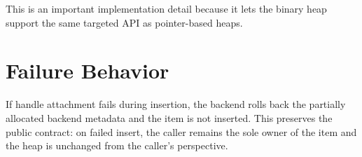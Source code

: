 This is an important implementation detail because it lets the binary heap support the same targeted API as pointer-based heaps.

\section{Failure Behavior}

If handle attachment fails during insertion, the backend rolls back the partially allocated backend metadata and the item is not inserted.
This preserves the public contract: on failed insert, the caller remains the sole owner of the item and the heap is unchanged from the caller's perspective.
